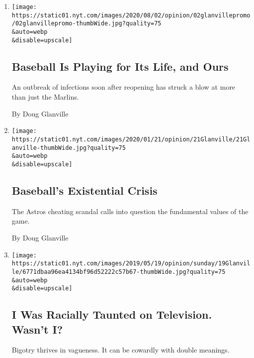 \begin{enumerate}
\def\labelenumi{\arabic{enumi}.}
\item
  \href{/2020/08/02/opinion/baseball-coronavirus-Marlins.html}{}

  \texttt{[image: https://static01.nyt.com/images/2020/08/02/opinion/02glanvillepromo/02glanvillepromo-thumbWide.jpg?quality=75\\\&auto=webp\\\&disable=upscale]}

  \hypertarget{baseball-is-playing-for-its-life-and-ours}{%
  \subsection{Baseball Is Playing for Its Life, and
  Ours}\label{baseball-is-playing-for-its-life-and-ours}}

  An outbreak of infections soon after reopening has struck a blow at
  more than just the Marlins.

  By Doug Glanville
\item
  \href{/2020/01/21/opinion/the-astros-cheating.html}{}

  \texttt{[image: https://static01.nyt.com/images/2020/01/21/opinion/21Glanville/21Glanville-thumbWide.jpg?quality=75\\\&auto=webp\\\&disable=upscale]}

  \hypertarget{baseballs-existential-crisis}{%
  \subsection{Baseball's Existential
  Crisis}\label{baseballs-existential-crisis}}

  The Astros cheating scandal calls into question the fundamental values
  of the game.

  By Doug Glanville
\item
  \href{/2019/05/18/opinion/sunday/doug-glanville-cubs.html}{}

  \texttt{[image: https://static01.nyt.com/images/2019/05/19/opinion/sunday/19Glanville/6771dbaa96ea4134bf96d52222c57b67-thumbWide.jpg?quality=75\\\&auto=webp\\\&disable=upscale]}

  \hypertarget{i-was-racially-taunted-on-television-wasnt-i}{%
  \subsection{I Was Racially Taunted on Television. Wasn't
  I?}\label{i-was-racially-taunted-on-television-wasnt-i}}

  Bigotry thrives in vagueness. It can be cowardly with double meanings.


\end{enumerate}
